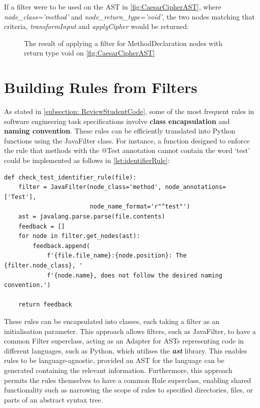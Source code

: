 If a filter were to be used on the AST in \cref{fig:CaesarCipherAST}, where \emph{node\_class='method'} and \emph{node\_return\_type='void'}, the two nodes matching that criteria, \emph{transformInput} and \emph{applyCipher} would be returned:

\begin{figure}[H]
    \centering
    
    \caption{The result of applying a filter for MethodDeclaration nodes with return type void on \cref{fig:CaesarCipherAST}}
    \label{fig:CaesarCipherFilteredAST}
\end{figure}

\section{Building Rules from Filters}

As stated in \cref{subsection: ReviewStudentCode}, some of the most frequent rules in software engineering task specifications involve \textbf{class encapsulation} and \textbf{naming convention}. These rules can be efficiently translated into Python functions using the JavaFilter class. For instance, a function designed to enforce the rule that methods with the @Test annotation cannot contain the word `test' could be implemented as follows in \cref{lst:identifierRule}:

\begin{listing}[H]
\begin{verbatim}
def check_test_identifier_rule(file):
    filter = JavaFilter(node_class='method', node_annotations=['Test'],
                        node_name_format='r"^test"')
    ast = javalang.parse.parse(file.contents)
    feedback = []
    for node in filter.get_nodes(ast):
        feedback.append(
            f'{file.file_name}:{node.position}: The {filter.node_class}, '
            f'{node.name}, does not follow the desired naming convention.')

    return feedback
\end{verbatim}
\caption{A Python function to produce feedback on test methods that contain `test' within their identifier}
\label{lst:identifierRule}
\end{listing}

These rules can be encapsulated into classes, each taking a filter as an initialisation parameter. This approach allows filters, such as JavaFilter, to have a common Filter superclass, acting as an Adapter for ASTs representing code in different languages, such as Python, which utilises the \textbf{\emph{ast}} library. This enables rules to be language-agnostic, provided an AST for the language can be generated containing the relevant information. Furthermore, this approach permits the rules themselves to have a common Rule superclass, enabling shared functionality such as narrowing the scope of rules to specified directories, files, or parts of an abstract syntax tree.


